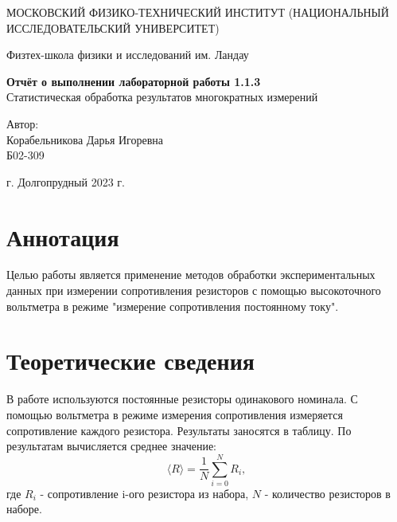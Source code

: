 \documentclass[a4paper,12pt]{article}
\begin{document}
	
	\begin{titlepage}
		\begin{center}
			{\large МОСКОВСКИЙ ФИЗИКО-ТЕХНИЧЕСКИЙ ИНСТИТУТ (НАЦИОНАЛЬНЫЙ ИССЛЕДОВАТЕЛЬСКИЙ УНИВЕРСИТЕТ)}
		\end{center}
		\begin{center}
            \vspace{1.5cm}
			{\large Физтех-школа физики и исследований им. Ландау}
		\end{center}
		
		
		\vspace{4.5cm}
		{\huge
			\begin{center}
				{\bf Отчёт о выполнении лабораторной работы 1.1.3}\\
				Статистическая обработка результатов многократных измерений
			\end{center}
		}
  
		
		\begin{flushright}
			{\LARGE Автор:\\ Корабельникова Дарья Игоревна \\
				\vspace{0.2cm}
				Б02-309}
		\end{flushright}
		\vspace{7.5cm}
		\begin{center}
			г. Долгопрудный 2023 г.
		\end{center}
	\end{titlepage}

	\section{Аннотация}
 \setlength{\parindent}{1cm} Целью работы является применение методов обработки экспериментальных данных при измерении сопротивления резисторов с помощью высокоточного вольтметра в режиме "измерение сопротивления постоянному току".
 	
	\section{Теоретические сведения}
В работе используются постоянные резисторы одинакового номинала. С помощью вольтметра в режиме измерения сопротивления измеряется сопротивление каждого резистора. Результаты заносятся в таблицу. По результатам вычисляется среднее значение:
 \begin{equation} 
			\langle R\rangle = \frac{1}{N} \sum_{i = 0}^{N}R_i ,
		\end{equation}
 где $R_i$ - сопротивление i-ого резистора из набора, $N$ - количество резисторов в наборе.
 
\end{document}
